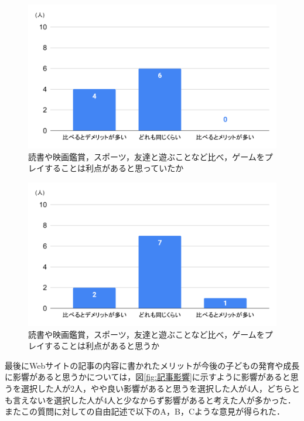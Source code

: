 \documentclass[12pt,a4j,titlepage]{ltjsarticle}
\begin{document}
\begin{figure}[H]
 \begin{center}
  \includegraphics[keepaspectratio, scale=0.5]{PDF/比較前.pdf}
 \end{center}
 \caption{読書や映画鑑賞，スポーツ，友達と遊ぶことなど比べ，ゲームをプレイすることは利点があると思っていたか}
 \label{fig:比較前}
\end{figure}

\begin{figure}[H]
 \begin{center}
  \includegraphics[keepaspectratio, scale=0.5]{PDF/比較後.pdf}
 \end{center}
 \caption{読書や映画鑑賞，スポーツ，友達と遊ぶことなど比べ，ゲームをプレイすることは利点があると思うか}
 \label{fig:比較後}
\end{figure}

最後にWebサイトの記事の内容に書かれたメリットが今後の子どもの発育や成長に影響があると思うかについては，図\ref{fig:記事影響}に示すように影響があると思うを選択した人が2人，やや良い影響があると思うを選択した人が4人，どちらとも言えないを選択した人が4人と少なからず影響があると考えた人が多かった．
またこの質問に対しての自由記述で以下のA，B，Cような意見が得られた．
\end{document}
